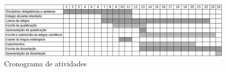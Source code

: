 \begin{figure}[H]
\includegraphics[width=1 \textwidth]{cronograma_atividades.png}
\begin{center}
\caption{Cronograma de atividades \label{cronograma_atividade}}
\end{center}
\end{figure}

